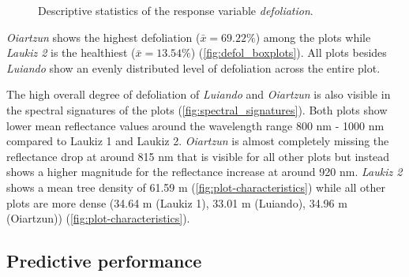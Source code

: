 \documentclass[review]{elsarticle}
\begin{document}
\begin{figure} [t!]
	\begin{center}
		\caption{Descriptive statistics of the response variable \textit{defoliation}.}
		\label{fig:defol_boxplots}
	\end{center}
\end{figure}

\noindent \textit{Oiartzun} shows the highest defoliation ($\bar{x} = 69.22 \%$) among the plots while \textit{Laukiz 2} is the healthiest ($\bar{x} = 13.54 \%$) (\autoref{fig:defol_boxplots}).
All plots besides \textit{Luiando} show an evenly distributed level of defoliation across the entire plot.

\noindent The high overall degree of defoliation of \textit{Luiando} and \textit{Oiartzun} is also visible in the spectral signatures of the plots (\autoref{fig:spectral_signatures}).
Both plots show lower mean reflectance values around the wavelength range 800 nm - 1000 nm compared to Laukiz 1 and Laukiz 2.
\textit{Oiartzun} is almost completely missing the reflectance drop at around 815 nm that is visible for all other plots but instead shows a higher magnitude for the reflectance increase at around 920 nm.
\textit{Laukiz 2} shows a mean tree density of 61.59 m (\autoref{fig:plot-characteristics}) while all other plots are more dense (34.64 m (Laukiz 1), 33.01 m (Luiando), 34.96 m (Oiartzun)) (\autoref{fig:plot-characteristics}).

\subsection{Predictive performance}
\end{document}
